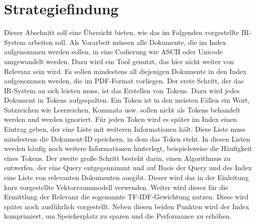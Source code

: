\section{Strategiefindung}
Dieser Abschnitt soll eine Übersicht bieten, wie das im Folgenden vorgestellte IR-System arbeiten soll.
\newline
Als Vorarbeit müssen alle Dokumente, die im Index aufgenommen werden sollen, in eine Codierung wie ASCII oder Unicode umgewandelt werden. Dazu wird ein Tool genutzt, das hier nicht weiter von Relevanz sein wird.
Es sollen mindestens all diejenigen Dokumente in den Index aufgenommen werden, die im PDF-Format vorliegen.
\newline
Der erste Schritt, der das IR-System an sich leisten muss, ist das Erstellen von Tokens. Dazu wird jedes Dokument in Tokens aufgespalten. Ein Token ist in den meisten Fällen ein Wort, Satzzeichen wie Leerzeichen, Kommata usw. sollen nicht als Tokens behandelt werden und werden ignoriert.
\newline
Für jeden Token wird es später im Index einen Eintrag geben, der eine Liste mit weiteren Informationen hält. Diese Liste muss mindestens die Dokument-ID speichern, in dem das Token steht. In diesen Listen werden häufig noch weitere Informationen hinterlegt, beispielsweise die Häufigkeit eines Tokens.
\newline
Der zweite große Schritt besteht darin, einen Algorithmus zu entwerfen, der eine Query entgegennimmt und auf Basis der Query und des Index eine Liste von relevanten Dokumenten ausgibt. Dieser wird das in der Einleitung kurz vorgestellte Vektorraummodell verwenden. Weiter wird dieser für die Ermittlung der Relevanz die sogenannte TF-IDF-Gewichtung nutzen. Diese wird später noch ausführlich vorgestellt.
\newline
Neben diesen beiden Punkten wird der Index komprimiert, um Speicherplatz zu sparen und die Performance zu erhöhen.